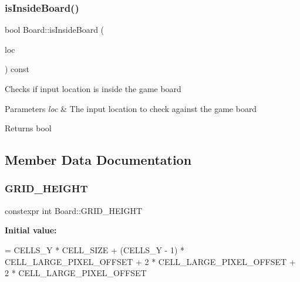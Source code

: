 \subsubsection{\texorpdfstring{is\+Inside\+Board()}{isInsideBoard()}}
{\footnotesize\ttfamily bool Board\+::is\+Inside\+Board (\begin{DoxyParamCaption}\item[{const \hyperlink{class_pixel_location}{Pixel\+Location}}]{loc }\end{DoxyParamCaption}) const}

Checks if input location is inside the game board


\begin{DoxyParams}{Parameters}
{\em loc} & The input location to check against the game board \\
\hline
\end{DoxyParams}
\begin{DoxyReturn}{Returns}
bool 
\end{DoxyReturn}


\subsection{Member Data Documentation}
\mbox{\label{class_board_aff34c4b148c4ea0ee9fe7254a529ceee}} 
\subsubsection{\texorpdfstring{G\+R\+I\+D\+\_\+\+H\+E\+I\+G\+HT}{GRID\_HEIGHT}}
{\footnotesize\ttfamily constexpr int Board\+::\+G\+R\+I\+D\+\_\+\+H\+E\+I\+G\+HT\hspace{0.3cm}{\ttfamily [static]}}

{\bfseries Initial value\+:}
\begin{DoxyCode}
= CELLS\_Y * CELL\_SIZE + (CELLS\_Y - 1) * CELL\_LARGE\_PIXEL\_OFFSET + 2 * CELL\_LARGE\_PIXEL\_OFFSET
                                       + 2 * CELL\_LARGE\_PIXEL\_OFFSET
\end{DoxyCode}
\mbox{\label{class_board_ae781948bea97fe9c0469b10b0f61bf7d}} 
